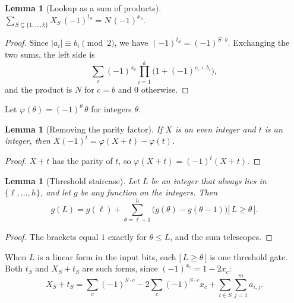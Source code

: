 \documentclass[11pt,letterpaper]{article}
\newtheorem{lemma}[theorem]{Lemma}
\theoremstyle{remark}
\newcommand{\ind}[1]{\bigl[\,#1\,\bigr]}
\begin{document}
\begin{lemma}[Lookup as a sum of products]\label{lem:lookup}
$\displaystyle\sum_{S\subseteq\{1,\dots,k\}}X_S\,(-1)^{t_S}=N\,(-1)^{x_b}.$
\end{lemma}
\begin{proof}
Since $|a_i|\equiv b_i\pmod2$, we have $(-1)^{t_S}=(-1)^{S\cdot b}$.
Exchanging the two sums, the left side is
\[
\sum_c(-1)^{x_c}\prod_{i=1}^k\bigl(1+(-1)^{c_i+b_i}\bigr),
\]
and the product is $N$ for $c=b$ and $0$ otherwise.
\end{proof}

Let $\varphi(\theta)=(-1)^\theta\,\theta$ for integers $\theta$.

\begin{lemma}[Removing the parity factor]\label{lem:parity}
If $X$ is an even integer and $t$ is an integer, then
$X(-1)^t=\varphi(X+t)-\varphi(t)$.
\end{lemma}
\begin{proof}
$X+t$ has the parity of $t$, so $\varphi(X+t)=(-1)^t(X+t)$.
\end{proof}

\begin{lemma}[Threshold staircase]\label{lem:ladder}
Let $L$ be an integer that always lies in $\{\ell,\dots,h\}$, and let $g$
be any function on the integers. Then
\[
g(L)=g(\ell)+\sum_{\theta=\ell+1}^{h}\bigl(g(\theta)-g(\theta-1)\bigr)\ind{L\ge\theta}.
\]
\end{lemma}
\begin{proof}
The brackets equal $1$ exactly for $\theta\le L$, and the sum telescopes.
\end{proof}

When $L$ is a linear form in the input bits, each $\ind{L\ge\theta}$ is one
threshold gate. Both $t_S$ and $X_S+t_S$ are such forms, since
$(-1)^{x_c}=1-2x_c$:
\begin{equation}\label{eq:form}
X_S+t_S=\sum_c(-1)^{S\cdot c}-2\sum_c(-1)^{S\cdot c}x_c+\sum_{i\in S}\sum_{j=1}^m a_{i,j}.
\end{equation}
\end{document}
